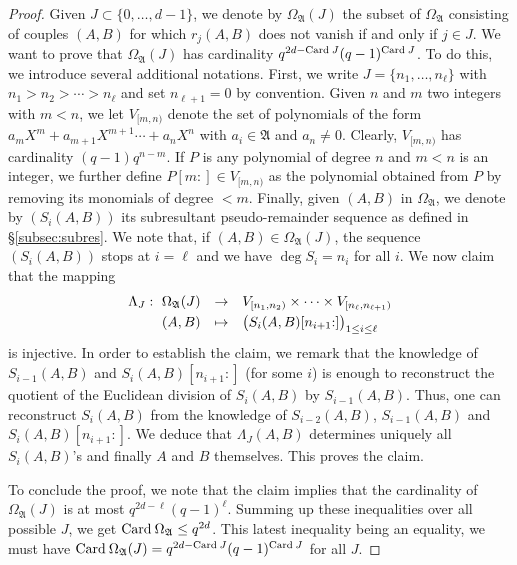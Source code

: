 \documentclass{jT}
\numberwithin{equation}{section}
\theoremstyle{definition}
\newcommand{\ring}{\mathfrak A}
\newcommand{\Card}{\text{\rm Card}\:}
\begin{document}
\begin{proof} 
Given $J \subset \{0, \ldots, d-1\}$, we denote by 
$\Omega_\ring(J)$ the subset of $\Omega_\ring$ consisting of
couples $(A,B)$ for which $r_j(A,B)$ does not vanish if and only if $j 
\in J$. We want to prove that $\Omega_\ring(J)$ has cardinality 
$q^{2d-\Card J} (q-1)^{\Card J}$. To do this, we introduce several 
additional notations. First, we write $J = \{n_1, \ldots, 
n_\ell\}$ with $n_1 > n_2 > \cdots > n_\ell$ and set $n_{\ell+1} = 
0$ by convention. Given $n$ and $m$ two integers with $m < n$, we let 
$V_{[m,n)}$ denote the set of polynomials of the form
$a_m X^m + a_{m+1} X^{m+1} \cdots + a_n X^n$
with $a_i \in \ring$ and $a_n \neq 0$. Clearly, $V_{[m,n)}$ has
cardinality $(q-1) q^{n-m}$. If $P$ is any polynomial of 
degree $n$ and $m < n$ is an integer, we further define $P[m{:}] \in 
V_{[m,n)}$ as the polynomial obtained from $P$ by removing its monomials 
of degree $< m$. Finally, given $(A,B)$ in $\Omega_\ring$, we 
denote by $(S_i(A,B))$ its subresultant pseudo-remainder sequence as 
defined in \S \ref{subsec:subres}. We note that, if $(A,B) \in 
\Omega_\ring(J)$, the sequence $(S_i(A,B))$ stops at $i = \ell$ and we 
have $\deg S_i = n_i$ for all $i$. We now claim that the mapping
$$\begin{array}{rcl} 
\Lambda_J : \,\, 
\Omega_\ring(J) & \to & 
V_{[n_1,n_2)} \times \cdots \times V_{[n_\ell,n_{\ell+1})} \smallskip \\
(A,B) & \mapsto & 
\big(S_i(A,B)[n_{i+1}{:}]\big)_{1 \leq i \leq \ell}
\end{array}$$ 
is injective. In order to establish the claim, we remark that the 
knowledge of $S_{i-1}(A,B)$ and $S_i(A,B)[n_{i+1}{:}]$ (for some $i$) 
is enough to reconstruct the quotient of the Euclidean division of 
$S_i(A,B)$ by $S_{i-1}(A,B)$. Thus, one can reconstruct $S_i(A,B)$ from 
the knowledge of 
$S_{i-2}(A,B)$, $S_{i-1}(A,B)$ and $S_i(A,B)[n_{i+1}{:}]$. We deduce 
that $\Lambda_J(A,B)$ determines uniquely all $S_i(A,B)$'s 
and finally $A$ and $B$ themselves. This proves the claim.

To conclude the proof, we note that the claim implies that the cardinality of 
$\Omega_\ring(J)$ is at most $q^{2d-\ell} (q-1)^\ell$. Summing up these 
inequalities over all possible $J$, we get $\Card \Omega_\ring \leq 
q^{2d}$. This latest inequality being an equality, we must have
$\Card \Omega_\ring(J) = q^{2d-\Card J} (q-1)^{\Card J}$ for all $J$.
\end{proof}
\end{document}
